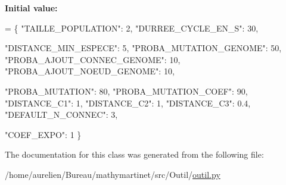 {\bfseries Initial value\+:}
\begin{DoxyCode}
=  \{
        \textcolor{stringliteral}{"TAILLE\_POPULATION"}: 2,
        \textcolor{stringliteral}{"DURREE\_CYCLE\_EN\_S"}: 30,

        \textcolor{stringliteral}{"DISTANCE\_MIN\_ESPECE"}: 5,
        \textcolor{stringliteral}{"PROBA\_MUTATION\_GENOME"}: 50,
        \textcolor{stringliteral}{"PROBA\_AJOUT\_CONNEC\_GENOME"}: 10,
        \textcolor{stringliteral}{"PROBA\_AJOUT\_NOEUD\_GENOME"}: 10,

        \textcolor{stringliteral}{"PROBA\_MUTATION"}: 80,
        \textcolor{stringliteral}{"PROBA\_MUTATION\_COEF"}: 90,
        \textcolor{stringliteral}{"DISTANCE\_C1"}: 1,
        \textcolor{stringliteral}{"DISTANCE\_C2"}: 1,
        \textcolor{stringliteral}{"DISTANCE\_C3"}: 0.4,
        \textcolor{stringliteral}{"DEFAULT\_N\_CONNEC"}: 3,

        \textcolor{stringliteral}{"COEF\_EXPO"}: 1
       \}
\end{DoxyCode}


The documentation for this class was generated from the following file\+:\begin{DoxyCompactItemize}
\item 
/home/aurelien/\+Bureau/mathymartinet/src/\+Outil/\hyperlink{outil_8py}{outil.\+py}\end{DoxyCompactItemize}
